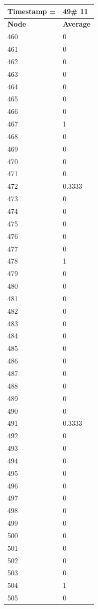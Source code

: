 \begin{tabular}{|l||l|}
\hline
\textbf{Timestamp =} & \textbf{49}\# 11\\\hline
	\textbf{Node} & \textbf{Average} \\ \hline
\hline
	460 & 0 \\ \hline
	461 & 0 \\ \hline
	462 & 0 \\ \hline
	463 & 0 \\ \hline
	464 & 0 \\ \hline
	465 & 0 \\ \hline
	466 & 0 \\ \hline
	467 & 1 \\ \hline
	468 & 0 \\ \hline
	469 & 0 \\ \hline
	470 & 0 \\ \hline
	471 & 0 \\ \hline
	472 & 0.3333 \\ \hline
	473 & 0 \\ \hline
	474 & 0 \\ \hline
	475 & 0 \\ \hline
	476 & 0 \\ \hline
	477 & 0 \\ \hline
	478 & 1 \\ \hline
	479 & 0 \\ \hline
	480 & 0 \\ \hline
	481 & 0 \\ \hline
	482 & 0 \\ \hline
	483 & 0 \\ \hline
	484 & 0 \\ \hline
	485 & 0 \\ \hline
	486 & 0 \\ \hline
	487 & 0 \\ \hline
	488 & 0 \\ \hline
	489 & 0 \\ \hline
	490 & 0 \\ \hline
	491 & 0.3333 \\ \hline
	492 & 0 \\ \hline
	493 & 0 \\ \hline
	494 & 0 \\ \hline
	495 & 0 \\ \hline
	496 & 0 \\ \hline
	497 & 0 \\ \hline
	498 & 0 \\ \hline
	499 & 0 \\ \hline
	500 & 0 \\ \hline
	501 & 0 \\ \hline
	502 & 0 \\ \hline
	503 & 0 \\ \hline
	504 & 1 \\ \hline
	505 & 0 \\ \hline
\end{tabular}
